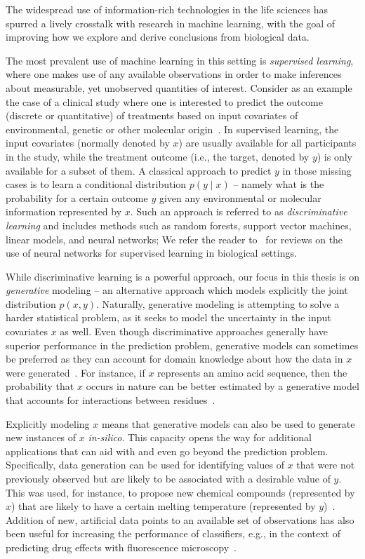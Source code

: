 The widespread use of information-rich technologies in the life sciences has spurred a lively crosstalk with research in machine learning, with the goal of improving how we explore and derive conclusions from biological data. 

The most prevalent use of machine learning in this setting is \textit{supervised learning}, where one makes use of any available observations in order to make inferences about measurable, yet unobserved quantities of interest. Consider as an example the case of a clinical study where one is interested to predict the outcome (discrete or quantitative) of treatments based on input covariates of environmental, genetic or other molecular origin~\cite{Rajkomar2018, Dincer2018a}. In supervised learning, the input covariates (normally denoted by $x$) are usually available for all participants in the study, while the treatment outcome (i.e., the target, denoted by $y$) is only available for a subset of them. A classical approach to predict $y$ in those missing cases is to learn a conditional distribution $p\left(y \mid x \right)$ -- namely what is the probability for a certain outcome $y$ given any environmental or molecular information represented by $x$. Such an approach is referred to as \textit{discriminative learning} and includes methods such as random forests, support vector machines, linear models, and neural networks; We refer the reader to~\cite{Wainberg2018, Eraslan2019, Ching2018, Zou2019} for reviews on the use of neural networks for supervised learning in biological settings.


While discriminative learning is a powerful approach, our focus in this thesis is on \textit{generative} modeling -- an alternative approach which models explicitly the joint distribution $p\left(x, y\right)$. Naturally, generative modeling is attempting to solve a harder statistical problem, as it seeks to model the uncertainty in the input covariates $x$ as well. Even though discriminative approaches generally have superior performance in the prediction problem, generative models can sometimes be preferred as they can account for domain knowledge about how the data in $x$ were generated~\cite{ng2002discriminative}. For instance, if $x$ represents an amino acid sequence, then the probability that $x$ occurs in nature can be better estimated by a generative model that accounts for interactions between residues~\cite{Riesselman2018}. 


Explicitly modeling $x$ means that generative models can also be used to generate new instances of $x$ \textit{in-silico}. This capacity opens the way for additional applications that can aid with and even go beyond the prediction problem. Specifically, data generation can be used for identifying values of $x$ that were not previously observed but are likely to be associated with a desirable value of $y$. This was used, for instance, to propose new chemical compounds (represented by $x$) that are likely to have a certain melting temperature (represented by $y$)~\cite{Sanchez-Lengeling2017}. Addition of new, artificial data points to an available set of observations has also been useful for increasing the performance of classifiers, e.g., in the context of predicting drug effects with fluorescence microscopy~\cite{lafarge2018capturing}.   

